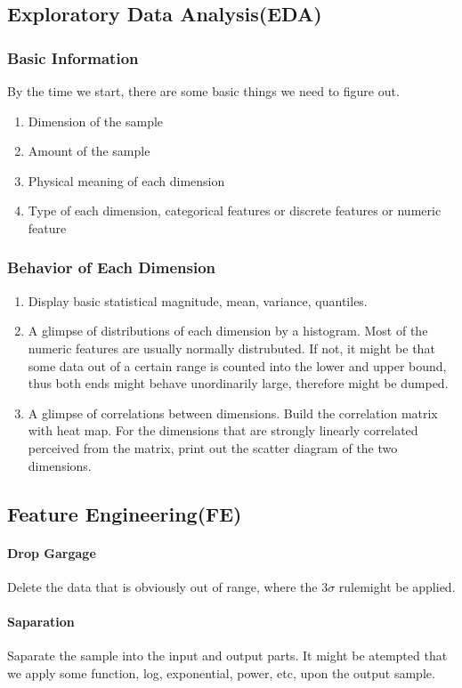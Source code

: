 \documentclass{article}
\begin{document}
\subsection{Exploratory Data Analysis(EDA)}
\subsubsection{Basic Information}
By the time we start, there are some basic things we need to figure out.
\begin{enumerate}
	\item Dimension of the sample
	\item Amount of the sample
	\item Physical meaning of each dimension
	\item Type of each dimension, categorical features or discrete features or numeric feature
\end{enumerate}
\subsubsection{Behavior of Each Dimension}
\begin{enumerate}
	\item Display basic statistical magnitude, mean, variance, quantiles.
	\item A glimpse of distributions of each dimension by a histogram. Most of the numeric features are usually normally distrubuted. If not, it might be that some data out of a certain range is counted into the lower and upper bound, thus both ends might behave unordinarily large, therefore might be dumped.
	\item A glimpse of correlations between dimensions. Build the correlation matrix with heat map. For the dimensions that are strongly linearly correlated perceived from the matrix, print out the scatter diagram of the two dimensions.
\end{enumerate}
\subsection{Feature Engineering(FE)}
	\paragraph{Drop Gargage}
	Delete the data that is obviously out of range, where the $3\sigma$ rulemight be applied.
	\paragraph{Saparation}
	Saparate the sample into the input and output parts. It might be atempted that we apply some function, log, exponential, power, etc, upon the output sample.
\end{document}
